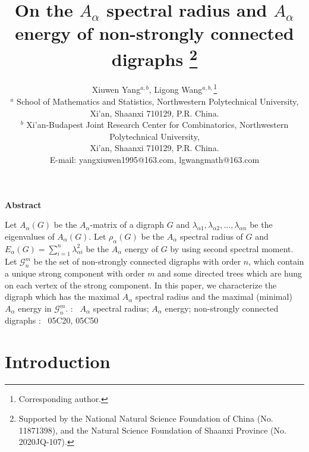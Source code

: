 \documentclass[11pt]{article}
\begin{document}
\textwidth 150mm \textheight 225mm
\title{On the $A_\alpha$ spectral radius and $A_\alpha$ energy of non-strongly connected digraphs \thanks{\small Supported by the National Natural Science Foundation of China (No. 11871398), and the Natural Science Foundation of Shaanxi Province (No. 2020JQ-107).}}

\author{{Xiuwen Yang$^{a,b}$, Ligong Wang$^{a,b,}$\footnote{Corresponding author.}}\\
{\small $^{a}$  School of Mathematics and Statistics, Northwestern Polytechnical University,}\\{\small  Xi'an, Shaanxi 710129, P.R. China.}\\ {\small $^{b}$ Xi'an-Budapest Joint Research Center for Combinatorics, Northwestern Polytechnical University,}\\{\small  Xi'an, Shaanxi 710129, P.R. China.}\\{\small E-mail: yangxiuwen1995@163.com, lgwangmath@163.com}}
\date{}
\maketitle
\begin{center}
\begin{minipage}{135mm}
\vskip 0.3cm
\begin{center}
{\small {\bf Abstract}}
\end{center}
{\small Let $A_\alpha(G)$ be the $A_\alpha$-matrix of a digraph $G$ and $\lambda_{\alpha 1}, \lambda_{\alpha 2}, \ldots, \lambda_{\alpha n}$ be the eigenvalues of $A_\alpha(G)$. Let $\rho_\alpha(G)$ be the $A_\alpha$ spectral radius of $G$ and $E_\alpha(G)=\sum_{i=1}^n \lambda_{\alpha i}^2$ be the $A_\alpha$ energy of $G$ by using second spectral moment. Let $\mathcal{G}_n^m$ be the set of non-strongly connected digraphs with order $n$, which contain a unique strong component with order $m$ and some directed trees which are hung on each vertex of the strong component. In this paper, we characterize the digraph which has the maximal $A_\alpha$ spectral radius and the maximal (minimal) $A_\alpha$ energy in $\mathcal{G}_n^m$.
\vskip 0.1in : \ $A_\alpha$ spectral radius; $A_\alpha$ energy; non-strongly connected digraphs \vskip
0.1in : \ 05C20, 05C50 }
\end{minipage}
\end{center}

\section{Introduction }
\end{document}
